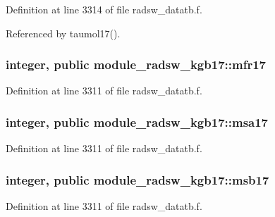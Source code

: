 Definition at line 3314 of file radsw\+\_\+datatb.\+f.



Referenced by taumol17().

\subsubsection[{\texorpdfstring{mfr17}{mfr17}}]{\setlength{\rightskip}{0pt plus 5cm}integer, public module\+\_\+radsw\+\_\+kgb17\+::mfr17}\hypertarget{namespacemodule__radsw__kgb17_add099d7e1b5e7767d77de6d96673e26f}{}\label{namespacemodule__radsw__kgb17_add099d7e1b5e7767d77de6d96673e26f}


Definition at line 3311 of file radsw\+\_\+datatb.\+f.

\subsubsection[{\texorpdfstring{msa17}{msa17}}]{\setlength{\rightskip}{0pt plus 5cm}integer, public module\+\_\+radsw\+\_\+kgb17\+::msa17}\hypertarget{namespacemodule__radsw__kgb17_ac139ff93555c22e658cb767fa7142e08}{}\label{namespacemodule__radsw__kgb17_ac139ff93555c22e658cb767fa7142e08}


Definition at line 3311 of file radsw\+\_\+datatb.\+f.

\subsubsection[{\texorpdfstring{msb17}{msb17}}]{\setlength{\rightskip}{0pt plus 5cm}integer, public module\+\_\+radsw\+\_\+kgb17\+::msb17}\hypertarget{namespacemodule__radsw__kgb17_afbb056103147b8e5f4d5a8af40420ea0}{}\label{namespacemodule__radsw__kgb17_afbb056103147b8e5f4d5a8af40420ea0}


Definition at line 3311 of file radsw\+\_\+datatb.\+f.

